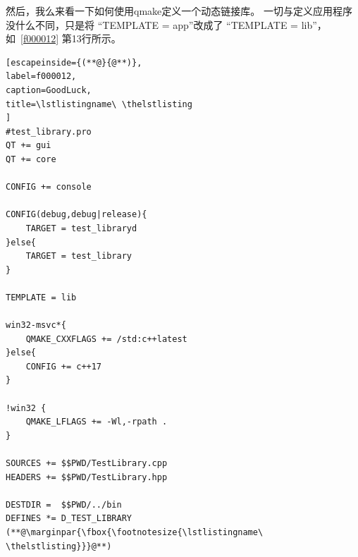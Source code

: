 然后，我么来看一下如何使用qmake定义一个动态链接库。
一切与定义应用程序没什么不同，只是将
“TEMPLATE {\sourcefonttwo{}=} app”改成了
“TEMPLATE {\sourcefonttwo{}=} lib”，如\lstlistingname\ \ref{f000012} 第13行所示。

\FloatBarrier
\begin{lstlisting}[escapeinside={(**@}{@**)},
label=f000012,
caption=GoodLuck,
title=\lstlistingname\ \thelstlisting
]
#test_library.pro
QT += gui
QT += core

CONFIG += console

CONFIG(debug,debug|release){
    TARGET = test_libraryd
}else{
    TARGET = test_library
}

TEMPLATE = lib

win32-msvc*{
    QMAKE_CXXFLAGS += /std:c++latest
}else{
    CONFIG += c++17
}

!win32 {
    QMAKE_LFLAGS += -Wl,-rpath .
}

SOURCES += $$PWD/TestLibrary.cpp
HEADERS += $$PWD/TestLibrary.hpp

DESTDIR =  $$PWD/../bin
DEFINES *= D_TEST_LIBRARY
(**@\marginpar{\fbox{\footnotesize{\lstlistingname\ \thelstlisting}}}@**)\end{lstlisting}          %


